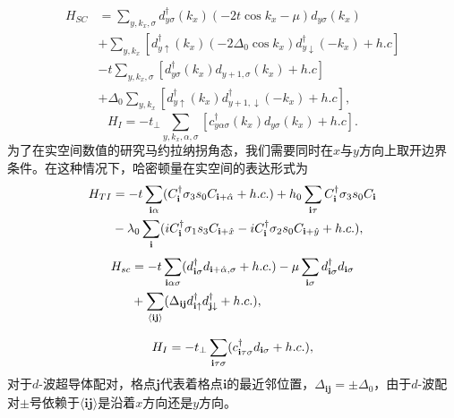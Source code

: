 \begin{equation}
	\begin{aligned}
		H_{SC} &= \sum_{y,k_x,\sigma}d^\dagger_{y\sigma}(k_x)(-2t\cos k_x -\mu)d_{y\sigma}(k_x)\\
		&+\sum_{y,k_x}[d^\dagger_{y\uparrow}(k_x)(-2\Delta_0\cos k_x)d^\dagger_{y\downarrow}(-k_x)+h.c]
		\\&-t\sum_{y,k_x,\sigma}[d^\dagger_{y\sigma}(k_x)d_{y+1,\sigma}(k_x)+h.c]\\
		&+\Delta_0\sum_{y,k_x}[d^\dagger_{y\uparrow}(k_x)d^\dagger_{y+1,\downarrow}(-k_x)+h.c],
	\end{aligned}
\end{equation}
\begin{equation}
	H_I=-t_\perp\sum_{y,k_x,\alpha,\sigma}[c^\dagger_{y\alpha\sigma}(k_x)d_{y\sigma}(k_x)+h.c].
\end{equation}
 为了在实空间数值的研究马约拉纳拐角态，我们需要同时在$x$与$y$方向上取开边界条件。在这种情况下，哈密顿量在实空间的表达形式为
\begin{equation}
	\begin{aligned}
		H_{TI} &=-t\sum_{{\bf i}\alpha}(C_{{\bf i}}^\dagger \sigma_3s_0   C_{{\bf i}+\hat{\alpha}}+h.c.)+h_0\sum_{{\bf i}\tau}C_{{\bf i}}^\dagger \sigma_3s_0   C_{{\bf i}}
		\\&-\lambda_0\sum_{{\bf i}}(iC_{{\bf i}}^\dagger\sigma_1s_3C_{{\bf i}+\hat{x}}-iC_{{\bf i}}^\dagger\sigma_2s_0C_{{\bf i}+\hat{y}}+h.c.),
	\end{aligned}
\end{equation}
\begin{equation}
	\begin{aligned}
		H_{sc} &=-t\sum_{{\bf i}\alpha\sigma}(d_{{\bf i}\sigma}^\dagger d_{{\bf i}+\hat{\alpha},\sigma}+h.c.)-\mu\sum_{{\bf i}\sigma}d_{{\bf i}\sigma}^\dagger d_{{\bf i}\sigma}
		\\&+\sum_{\langle{\bf ij}\rangle}(\Delta_{\bf ij}d_{{\bf i}\uparrow}^\dagger d_{{\bf j}\downarrow}^\dagger+h.c.),
	\end{aligned}
\end{equation}

\begin{equation}
	H_{I}=-t_\perp \sum_{{\bf i}\tau\sigma}(c_{{\bf i}\tau\sigma}^\dagger d_{{\bf i}\sigma}+h.c.),
\end{equation}
对于$d$-波超导体配对，格点$\mathbf{j}$代表着格点$\mathbf{i}$的最近邻位置，$\Delta_\mathbf{ij}=\pm\Delta_0$，由于$d$-波配对$\pm$号依赖于$\langle\mathbf{ij}\rangle$是沿着$x$方向还是$y$方向。

